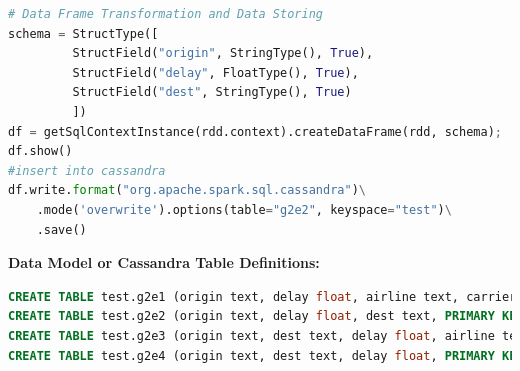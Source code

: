 \documentclass[fontsize=11pt,paper=a4]{scrartcl}
\begin{document}
\begin{lstlisting}[basicstyle=\small,language = python] 
# Data Frame Transformation and Data Storing 
schema = StructType([
         StructField("origin", StringType(), True),
         StructField("delay", FloatType(), True), 
         StructField("dest", StringType(), True)
         ])
df = getSqlContextInstance(rdd.context).createDataFrame(rdd, schema);  
df.show() 
#insert into cassandra 
df.write.format("org.apache.spark.sql.cassandra")\
    .mode('overwrite').options(table="g2e2", keyspace="test")\
    .save()
\end{lstlisting}
\textbf{Data Model or Cassandra Table Definitions: }
\begin{lstlisting}[basicstyle=\small,language = sql] 
CREATE TABLE test.g2e1 (origin text, delay float, airline text, carrier text, PRIMARY KEY (origin, airline) ); 
CREATE TABLE test.g2e2 (origin text, delay float, dest text, PRIMARY KEY (origin, dest) ); 
CREATE TABLE test.g2e3 (origin text, dest text, delay float, airline text, PRIMARY KEY ((origin, dest), airline)); 
CREATE TABLE test.g2e4 (origin text, dest text, delay float, PRIMARY KEY (origin, dest)); 
\end{lstlisting}
\end{document}
